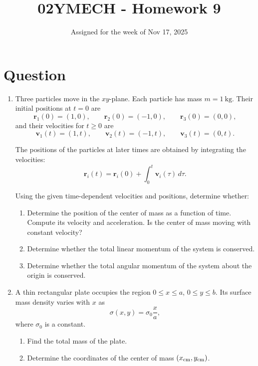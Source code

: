 \documentclass[12pt]{article}
\title{02YMECH - Homework 9}
\date{Assigned for the week of Nov 17, 2025}
\author{}
\begin{document}
\maketitle

\section*{Question}

\begin{enumerate}

\item Three particles move in the $xy$-plane. Each particle has mass $m = 1~\mathrm{kg}$. Their initial positions at $t=0$ are
\[
\mathbf r_1(0) = (1,0), \qquad
\mathbf r_2(0) = (-1,0), \qquad
\mathbf r_3(0) = (0,0),
\]
and their velocities for $t\ge 0$ are
\[
\mathbf v_1(t) = (1, t), \qquad
\mathbf v_2(t) = (-1, t), \qquad
\mathbf v_3(t) = (0, t).
\]

The positions of the particles at later times are obtained by integrating the velocities:
\[
\mathbf r_i(t) = \mathbf r_i(0) + \int_0^t \mathbf v_i(\tau)\, d\tau.
\]

Using the given time-dependent velocities and positions, determine whether:

\begin{enumerate}
    \item[(a)] Determine the position of the center of mass as a function of time. Compute its velocity and acceleration. Is the center of mass moving with constant velocity?
    \item[(b)] Determine whether the total linear momentum of the system is conserved.
    \item[(c)] Determine whether the total angular momentum of the system about the origin is conserved.
\end{enumerate}


\item A thin rectangular plate occupies the region \(0 \le x \le a\), \(0 \le y \le b\). Its surface mass density varies with \(x\) as 
\[
\sigma(x, y) = \sigma_0 \frac{x}{a},
\] 
where \(\sigma_0\) is a constant.  

\begin{enumerate}
    \item[(a)] Find the total mass of the plate.
    \item[(b)] Determine the coordinates of the center of mass \((x_{\rm cm}, y_{\rm cm})\).
\end{enumerate}

\end{enumerate}
\end{document}
